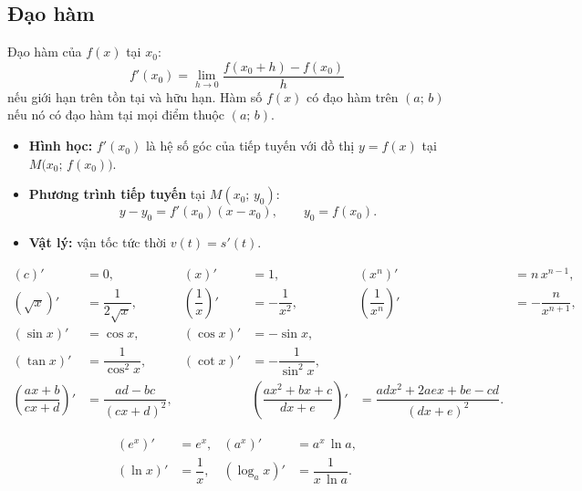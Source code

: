 \documentclass[12pt,a4paper]{article}
\begin{document}
\subsection{Đạo hàm}

\begin{dinhnghia}
  Đạo hàm của $f(x)$ tại $x_0$:
  \[
    f'(x_0) = \lim_{h \to 0} \dfrac{f(x_0 + h) - f(x_0)}{h}
  \]
  nếu giới hạn trên tồn tại và hữu hạn. Hàm số $f(x)$ có đạo hàm trên $(a;\,b)$ nếu nó có đạo hàm tại mọi điểm thuộc $(a;\,b)$.
\end{dinhnghia}

\begin{dinhnghia}[title={Ý nghĩa}]
  \begin{itemize}
    \item \textbf{Hình học:} $f'(x_0)$ là hệ số góc của tiếp tuyến với đồ thị $y = f(x)$ tại $M\bigl(x_0;\, f(x_0)\bigr)$.
    \item \textbf{Phương trình tiếp tuyến} tại $M(x_0;\, y_0)$:
      \[
        y - y_0 = f'(x_0)(x - x_0), \qquad y_0 = f(x_0).
      \]
    \item \textbf{Vật lý:} vận tốc tức thời $v(t) = s'(t)$.
  \end{itemize}
\end{dinhnghia}

\begin{congthuc}[title={Bảng đạo hàm cơ bản}]
  \begin{align*}
    (c)' &= 0, &
    (x)' &= 1, &
    (x^n)' &= n\,x^{n-1}, \\[2pt]
    (\sqrt{x})' &= \dfrac{1}{2\sqrt{x}}, &
    \left(\dfrac{1}{x}\right)' &= -\dfrac{1}{x^2}, &
    \left(\dfrac{1}{x^n}\right)' &= -\dfrac{n}{x^{n + 1}}, \\[4pt]
    (\sin x)' &= \cos x, &
    (\cos x)' &= -\sin x, \\[2pt]
    (\tan x)' &= \dfrac{1}{\cos^2 x}, &
    (\cot x)' &= -\dfrac{1}{\sin^2 x}, \\[2pt]
    (\dfrac{ax + b}{cx + d})' &= \dfrac{ad - bc}{(cx + d)^2}, & &
    (\dfrac{ax^2 + bx + c}{dx + e})' &= \dfrac{adx^2 + 2aex + be - cd}{(dx + e)^2}.
  \end{align*}
\end{congthuc}

\begin{congthuc}[title={Đạo hàm hàm mũ -- logarit}]
  \begin{align*}
    (e^x)' &= e^x, &
    (a^x)' &= a^x\,\ln a, \\[2pt]
    (\ln x)' &= \dfrac{1}{x}, &
    (\log_a x)' &= \dfrac{1}{x\,\ln a}.
  \end{align*}
\end{congthuc}
\end{document}
